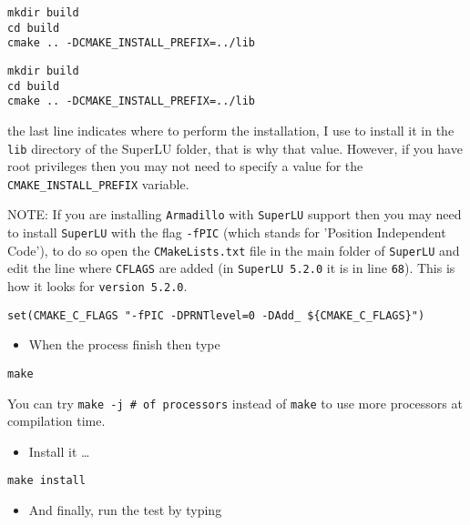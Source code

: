 \documentclass[11pt]{article}
\begin{document}
\begin{verbatim}
mkdir build
cd build
cmake .. -DCMAKE_INSTALL_PREFIX=../lib
\end{verbatim}

\begin{verbatim}
mkdir build
cd build
cmake .. -DCMAKE_INSTALL_PREFIX=../lib
\end{verbatim}

the last line indicates where to perform the installation, I use to
install it in the \texttt{lib} directory of the SuperLU folder, that is why
that value. However, if you have root privileges then you may not need
to specify a value for the \texttt{CMAKE\_INSTALL\_PREFIX} variable.

NOTE: If you are installing \texttt{Armadillo} with \texttt{SuperLU} support then
you may need to install \texttt{SuperLU} with the flag \texttt{-fPIC} (which stands
for 'Position Independent Code'), to do so open the \texttt{CMakeLists.txt}
file in the main folder of \texttt{SuperLU} and edit the line where \texttt{CFLAGS}
are added (in \texttt{SuperLU 5.2.0} it is in line \texttt{68}). This is how it
looks for \texttt{version 5.2.0}.

\begin{verbatim}
set(CMAKE_C_FLAGS "-fPIC -DPRNTlevel=0 -DAdd_ ${CMAKE_C_FLAGS}")
\end{verbatim}

\begin{itemize}
\item When the process finish then type
\end{itemize}

\begin{verbatim}
make
\end{verbatim}

You can try \texttt{make -j \# of processors} instead of \texttt{make} to use more
processors at compilation time.

\begin{itemize}
\item Install it \ldots{}
\end{itemize}

\begin{verbatim}
make install
\end{verbatim}

\begin{itemize}
\item And finally, run the test by typing
\end{itemize}
\end{document}
